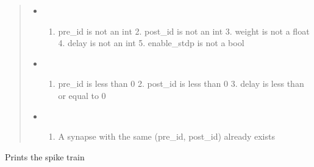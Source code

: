 \documentclass[letterpaper,10pt,english]{sphinxmanual}
\begin{document}
\begin{fulllineitems}
\begin{fulllineitems}
\begin{quote}
\begin{description}
\begin{itemize}
\end{itemize}

\begin{itemize}
\item {} 
\sphinxAtStartPar
{} \textendash{} \begin{enumerate}
%
\item {} 
\sphinxAtStartPar
pre\_id is not an int
    2. post\_id is not an int
    3. weight is not a float
    4. delay is not an int
    5. enable\_stdp is not a bool

\end{enumerate}


\item {} 
\sphinxAtStartPar
{} \textendash{} \begin{enumerate}
%
\item {} 
\sphinxAtStartPar
pre\_id is less than 0
    2. post\_id is less than 0
    3. delay is less than or equal to 0

\end{enumerate}


\item {} 
\sphinxAtStartPar
{} \textendash{} \begin{enumerate}
%
\item {} 
\sphinxAtStartPar
A synapse with the same (pre\_id, post\_id) already exists

\end{enumerate}


\end{itemize}

\end{description}\end{quote}

\end{fulllineitems}


\begin{fulllineitems}
\label{\detokenize{index:id3}}
\pysigstartsignatures
\pysiglinewithargsret
{}
{}
{}
\pysigstopsignatures
\sphinxAtStartPar
Prints the spike train


\end{fulllineitems}
\end{fulllineitems}
\end{document}
